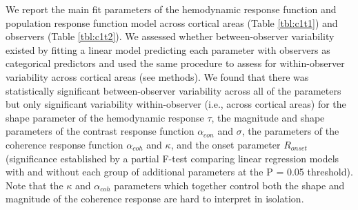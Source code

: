 \documentclass{report}
\begin{document}
We report the main fit parameters of the hemodynamic response function and population response function model across cortical areas (Table \ref{tbl:c1t1}) and observers (Table \ref{tbl:c1t2}). We assessed whether between-observer variability existed by fitting a linear model predicting each parameter with observers as categorical predictors and used the same procedure to assess for within-observer variability across cortical areas (see methods). We found that there was statistically significant between-observer variability across all of the parameters but only significant variability within-observer (i.e., across cortical areas) for the shape parameter of the hemodynamic response $\tau$, the magnitude and shape parameters of the contrast response function $\alpha_{con}$ and $\sigma$, the parameters of the coherence response function $\alpha_{coh}$ and $\kappa$, and the onset parameter $R_{onset}$ (significance established by a partial F-test comparing linear regression models with and without each group of additional parameters at the P = 0.05 threshold). Note that the $\kappa$ and $\alpha_{coh}$ parameters which together control both the shape and magnitude of the coherence response are hard to interpret in isolation.
\end{document}
